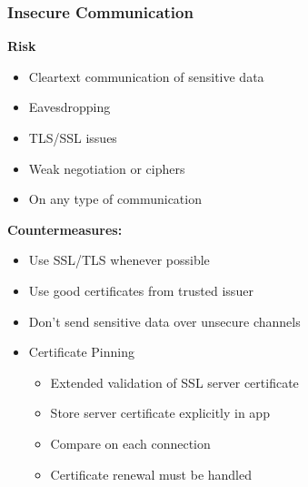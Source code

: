 \subsubsection{Insecure Communication}
\textbf{Risk}
\begin{itemize}
    \item Cleartext communication of sensitive data
    \item Eavesdropping
    \item TLS/SSL issues
    \item Weak negotiation or ciphers
    \item On any type of communication
\end{itemize}
\textbf{Countermeasures:}
\begin{itemize}
    \item Use SSL/TLS whenever possible
    \item Use good certificates from trusted issuer
    \item Don't send sensitive data over unsecure channels
    \item Certificate Pinning
    \begin{itemize}
        \item Extended validation of SSL server certificate
        \item Store server certificate explicitly in app
        \item Compare on each connection
        \item Certificate renewal must be handled
    \end{itemize}
\end{itemize}